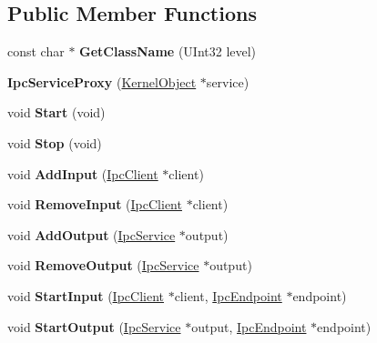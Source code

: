 \subsection*{Public Member Functions}
\begin{DoxyCompactItemize}
\item 
\mbox{\label{class_ipc_service_proxy_aeea02a14085ba594c2dd04d0e5f4c01f}} 
const char $\ast$ {\bfseries Get\+Class\+Name} (U\+Int32 level)
\item 
\mbox{\label{class_ipc_service_proxy_a2c7305b9e500893e0507c095085f9707}} 
{\bfseries Ipc\+Service\+Proxy} (\hyperlink{class_kernel_object}{Kernel\+Object} $\ast$service)
\item 
\mbox{\label{class_ipc_service_proxy_a64b67c108def90875d6083839f55dde4}} 
void {\bfseries Start} (void)
\item 
\mbox{\label{class_ipc_service_proxy_a81b49fcb66b5f03560c2e4a9a77a520f}} 
void {\bfseries Stop} (void)
\item 
\mbox{\label{class_ipc_service_proxy_afd46bd212b66190dcbe23a1967f7a300}} 
void {\bfseries Add\+Input} (\hyperlink{class_ipc_client}{Ipc\+Client} $\ast$client)
\item 
\mbox{\label{class_ipc_service_proxy_ab0dfc25c4a4ef39ec57c6b04bf3d3ef9}} 
void {\bfseries Remove\+Input} (\hyperlink{class_ipc_client}{Ipc\+Client} $\ast$client)
\item 
\mbox{\label{class_ipc_service_proxy_a3e63be453b52b7df750d7b69e05819e5}} 
void {\bfseries Add\+Output} (\hyperlink{class_ipc_service}{Ipc\+Service} $\ast$output)
\item 
\mbox{\label{class_ipc_service_proxy_a2d317fdbe413ede786105567c17e63aa}} 
void {\bfseries Remove\+Output} (\hyperlink{class_ipc_service}{Ipc\+Service} $\ast$output)
\item 
\mbox{\label{class_ipc_service_proxy_a0473580c2108a6c47bf1e4f68fdff0a5}} 
void {\bfseries Start\+Input} (\hyperlink{class_ipc_client}{Ipc\+Client} $\ast$client, \hyperlink{class_ipc_endpoint}{Ipc\+Endpoint} $\ast$endpoint)
\item 
\mbox{\label{class_ipc_service_proxy_ae87be63fc05b775b403837a2174afbec}} 
void {\bfseries Start\+Output} (\hyperlink{class_ipc_service}{Ipc\+Service} $\ast$output, \hyperlink{class_ipc_endpoint}{Ipc\+Endpoint} $\ast$endpoint)
\end{DoxyCompactItemize}
